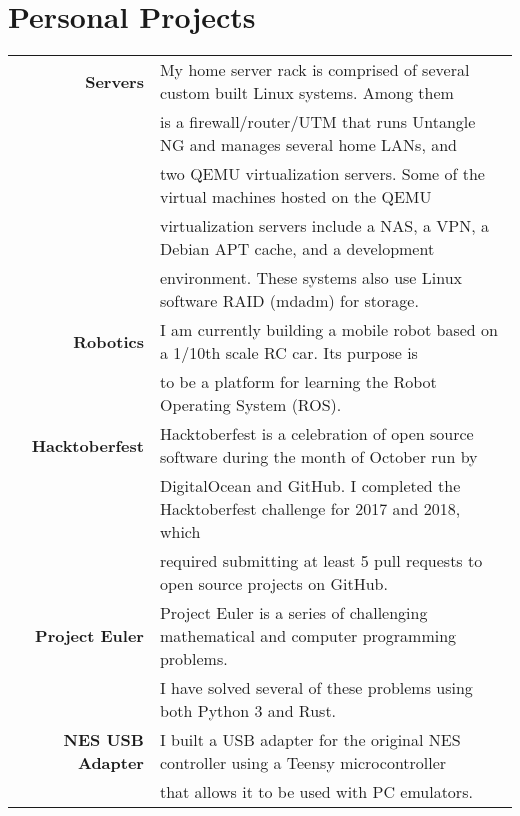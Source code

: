\documentclass[letterpaper,10pt]{article}
\begin{document}
    \section*{Personal Projects}
        \vspace*{1ex}
        \begin{tabular}{rl}
            \textbf{Servers} & My home server rack is comprised of several custom built Linux systems. Among them \\
                             & is a firewall/router/UTM that runs Untangle NG and manages several home LANs, and \\
                             & two QEMU virtualization servers. Some of the virtual machines hosted on the QEMU \\
                             & virtualization servers include a NAS, a VPN, a Debian APT cache, and a development \\
                             & environment. These systems also use Linux software RAID (mdadm) for storage. \\[1ex]
            \textbf{Robotics} & I am currently building a mobile robot based on a 1/10th scale RC car. Its purpose is \\
                              & to be a platform for learning the Robot Operating System (ROS). \\[1ex]
            \textbf{Hacktoberfest} & Hacktoberfest is a celebration of open source software during the month of October run by \\
                                   & DigitalOcean and GitHub. I completed the Hacktoberfest challenge for 2017 and 2018, which \\
                                   & required submitting at least 5 pull requests to open source projects on GitHub. \\[1ex]
            \textbf{Project Euler} & Project Euler is a series of challenging mathematical and computer programming problems. \\
                                   & I have solved several of these problems using both Python 3 and Rust. \\[1ex]
            \textbf{NES USB Adapter} & I built a USB adapter for the original NES controller using a Teensy microcontroller \\
                                     & that allows it to be used with PC emulators. \\[1ex]
        \end{tabular}
\end{document}
